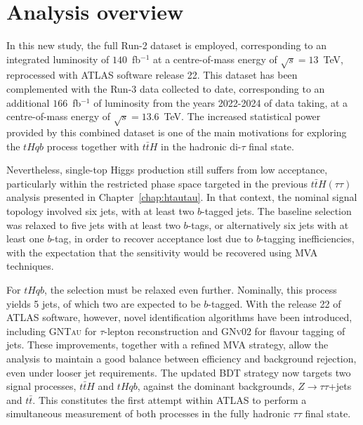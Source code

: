 \section{Analysis overview}

In this new study, the full Run-2 dataset is employed, corresponding to an integrated luminosity of $140$~fb$^{-1}$ at a centre-of-mass energy of $\sqrt{s}=13$~TeV, reprocessed with ATLAS software release 22. 
This dataset has been complemented with the Run-3 data collected to date, corresponding to an additional $166$~fb$^{-1}$ of luminosity from the years 2022-2024 of data taking, at a centre-of-mass energy of $\sqrt{s}=13.6$~TeV.
The increased statistical power provided by this combined dataset is one of the main motivations for exploring the $tHqb$ process together with $t\bar{t}H$ in the hadronic di-$\tau$ final state. 

Nevertheless, single-top Higgs production still suffers from low acceptance, particularly within the restricted phase space targeted in the previous $t\bar{t}H(\tau\tau)$ analysis presented in Chapter~\ref{chap:htautau}. 
In that context, the nominal signal topology involved six jets, with at least two $b$-tagged jets. 
The baseline selection was relaxed to five jets with at least two $b$-tags, or alternatively six jets with at least one $b$-tag, in order to recover acceptance lost due to $b$-tagging inefficiencies, with the expectation that the sensitivity would be recovered using MVA techniques. 

For $tHqb$, the selection must be relaxed even further. 
Nominally, this process yields 5 jets, of which two are expected to be $b$-tagged. 
With the release 22 of ATLAS software, however, novel identification algorithms have been introduced, including \textsc{GNTau} for $\tau$-lepton reconstruction and \textsc{GNv02} for flavour tagging of jets. 
These improvements, together with a refined MVA strategy, allow the analysis to maintain a good balance between efficiency and background rejection, even under looser jet requirements. 
The updated BDT strategy now targets two signal processes, $t\bar{t}H$ and $tHqb$, against the dominant backgrounds, $Z\to\tau\tau$+jets and $t\bar{t}$. 
This constitutes the first attempt within ATLAS to perform a simultaneous measurement of both processes in the fully hadronic $\tau\tau$ final state. 

